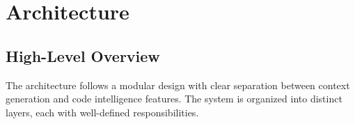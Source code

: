 
\section{Architecture}
\label{sec:architecture}

\subsection{High-Level Overview}

The \ctx{} architecture follows a modular design with clear separation between context generation and code intelligence features. The system is organized into distinct layers, each with well-defined responsibilities.

